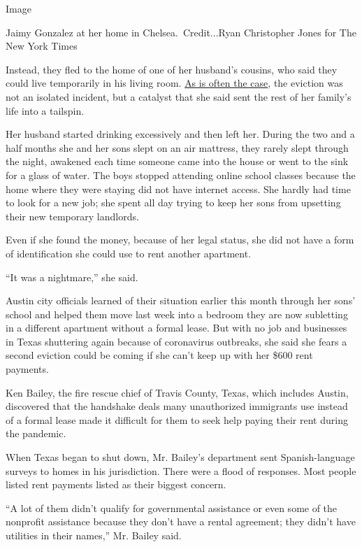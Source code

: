 Image

Jaimy Gonzalez at her home in Chelsea.~Credit...Ryan Christopher Jones
for The New York Times

Instead, they fled to the home of one of her husband's cousins, who said
they could live temporarily in his living room.
\href{https://www.nytimes.com/2016/02/22/books/evicted-book-review-matthew-desmond.html}{As
is often the case}, the eviction was not an isolated incident, but a
catalyst that she said sent the rest of her family's life into a
tailspin.

Her husband started drinking excessively and then left her. During the
two and a half months she and her sons slept on an air mattress, they
rarely slept through the night, awakened each time someone came into the
house or went to the sink for a glass of water. The boys stopped
attending online school classes because the home where they were staying
did not have internet access. She hardly had time to look for a new job;
she spent all day trying to keep her sons from upsetting their new
temporary landlords.

Even if she found the money, because of her legal status, she did not
have a form of identification she could use to rent another apartment.

``It was a nightmare,'' she said.

Austin city officials learned of their situation earlier this month
through her sons' school and helped them move last week into a bedroom
they are now subletting in a different apartment without a formal lease.
But with no job and businesses in Texas shuttering again because of
coronavirus outbreaks, she said she fears a second eviction could be
coming if she can't keep up with her \$600 rent payments.

Ken Bailey, the fire rescue chief of Travis County, Texas, which
includes Austin, discovered that the handshake deals many unauthorized
immigrants use instead of a formal lease made it difficult for them to
seek help paying their rent during the pandemic.

When Texas began to shut down, Mr. Bailey's department sent
Spanish-language surveys to homes in his jurisdiction. There were a
flood of responses. Most people listed rent payments listed as their
biggest concern.

``A lot of them didn't qualify for governmental assistance or even some
of the nonprofit assistance because they don't have a rental agreement;
they didn't have utilities in their names,'' Mr. Bailey said.

